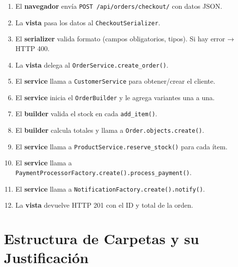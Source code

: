 \documentclass[12pt, a4paper]{article}
\begin{document}
\begin{enumerate}
  \item El \textbf{navegador} envía \texttt{POST /api/orders/checkout/} con datos JSON.
  \item La \textbf{vista} pasa los datos al \texttt{CheckoutSerializer}.
  \item El \textbf{serializer} valida formato (campos obligatorios, tipos). Si hay error → HTTP 400.
  \item La \textbf{vista} delega al \texttt{OrderService.create\_order()}.
  \item El \textbf{service} llama a \texttt{CustomerService} para obtener/crear el cliente.
  \item El \textbf{service} inicia el \texttt{OrderBuilder} y le agrega variantes una a una.
  \item El \textbf{builder} valida el stock en cada \texttt{add\_item()}.
  \item El \textbf{builder} calcula totales y llama a \texttt{Order.objects.create()}.
  \item El \textbf{service} llama a \texttt{ProductService.reserve\_stock()} para cada ítem.
  \item El \textbf{service} llama a \texttt{PaymentProcessorFactory.create().process\_payment()}.
  \item El \textbf{service} llama a \texttt{NotificationFactory.create().notify()}.
  \item La \textbf{vista} devuelve HTTP 201 con el ID y total de la orden.
\end{enumerate}

\section{Estructura de Carpetas y su Justificación}
\end{document}
